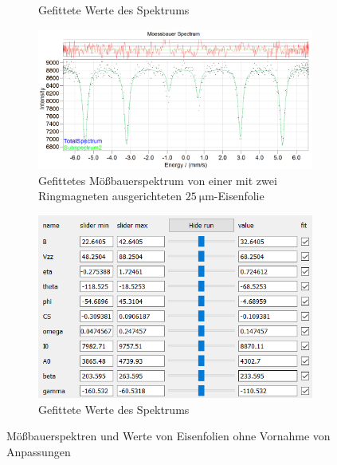 \documentclass[german, %
parskip=full, %
bibliography=totoc, %
]{scrartcl}
\begin{document}
\begin{figure}[ht]
\begin{subfigure}[b]{0.4\textwidth}
	  \caption{Gefittete Werte des Spektrums}
	  \label{fig:werte25geradeoA}
  \end{subfigure}
	\begin{subfigure}[b]{0.5\textwidth}
		\includegraphics[width=\textwidth]{MoessbauerEisen25MagnetRingOhneAnpassung}
	  \caption{Gefittetes Mößbauerspektrum von einer mit zwei Ringmagneten ausgerichteten \(\SI{25}{\micro\meter}\)-Eisenfolie}
	  \label{fig:moess25ringoA}
  \end{subfigure}
  \begin{subfigure}[b]{0.4\textwidth}
	  \includegraphics[width=\textwidth]{WerteEisen25MagnetRingOhneAnpassung}
	  \caption{Gefittete Werte des Spektrums}
	  \label{fig:werte25ringoA}
  \end{subfigure}
	\caption{Mößbauerspektren und Werte von Eisenfolien ohne Vornahme von Anpassungen}
	\label{fig:eisenoA}
\end{figure}
\end{document}
